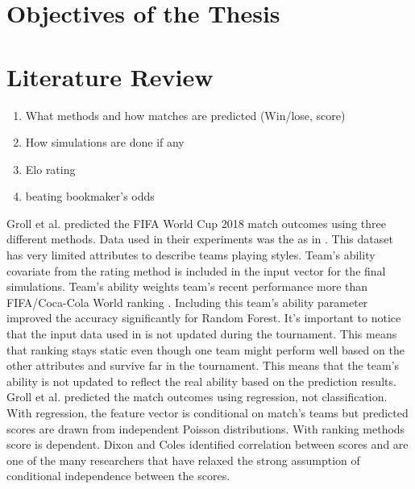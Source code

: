 \section{Objectives of the Thesis}
\section{Literature Review}

\begin{enumerate}
    \item What methods and how matches are predicted (Win/lose, score)
    \item How simulations are done if any
    \item Elo rating
    \item beating bookmaker's odds
\end{enumerate}

Groll et al. \cite{groll2018prediction} predicted the FIFA World Cup 2018 match outcomes using three different methods. Data used in their experiments was the as in \cite{groll2015prediction}. This dataset has very limited attributes to describe teams playing styles. Team's ability covariate from the rating method is included in the input vector for the final simulations. Team's ability weights team's recent performance more than FIFA/Coca-Cola World ranking . Including this team's ability parameter improved the accuracy significantly for Random Forest. It's important to notice that the input data used in \cite{groll2018prediction} is not updated during the tournament. This means that ranking stays static even though one team might perform well based on the other attributes and survive far in the tournament. This means that the team's ability is not updated to reflect the real ability based on the prediction results.
Groll et al. \cite{groll2018prediction} predicted the match outcomes using regression, not classification. With regression, the feature vector is conditional on match's teams but predicted scores are drawn from independent Poisson distributions. With ranking methods score is dependent. Dixon and Coles \cite{dixon1997} identified correlation between scores and are one of the many researchers that have relaxed the strong assumption of conditional independence between the scores.

